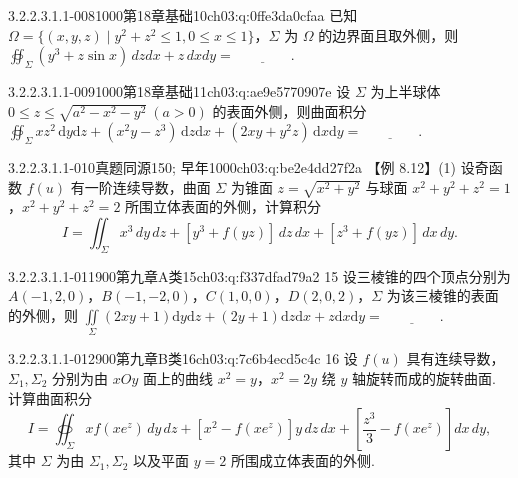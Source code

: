\begin{q}{3.2.2.3.1.1-008}{1000第18章基础10}{ch03:q:0ffe3da0cfaa}
已知 $\Omega = \{(x,y,z) \mid y^2+z^2 \le 1, 0 \le x \le 1\}$，$\Sigma$ 为 $\Omega$ 的边界面且取外侧，则
$\displaystyle \oiint_{\Sigma} (y^3+z\sin x)\,dzdx + z\,dxdy = \underline{\hspace{4em}}.$
\end{q}

\begin{q}{3.2.2.3.1.1-009}{1000第18章基础11}{ch03:q:ae9e5770907e}
设 $\Sigma$ 为上半球体 $0 \le z \le \sqrt{a^2-x^2-y^2}\ (a>0)$ 的表面外侧，则曲面积分
$\displaystyle \oiint_{\Sigma} x z^2\,\mathrm{d}y\mathrm{d}z+(x^2 y-z^3)\,\mathrm{d}z\mathrm{d}x+(2xy+y^2 z)\,\mathrm{d}x\mathrm{d}y=\underline{\hspace{4em}}.$
\end{q}

\begin{q}{3.2.2.3.1.1-010}{真题同源150; 早年1000}{ch03:q:be2e4dd27f2a}
【例 8.12】(1) 设奇函数 $f(u)$ 有一阶连续导数，曲面 $\Sigma$ 为锥面 $z=\sqrt{x^2+y^2}$ 与球面 $x^2+y^2+z^2=1$，$x^2+y^2+z^2=2$ 所围立体表面的外侧，计算积分
\[
I = \iint_{\Sigma} x^3\,dy\,dz + [y^3+f(yz)]\,dz\,dx + [z^3+f(yz)]\,dx\,dy.
\]
\end{q}

\begin{q}{3.2.2.3.1.1-011}{900第九章A类15}{ch03:q:f337dfad79a2}
15 设三棱锥的四个顶点分别为 $A(-1,2,0)$，$B(-1,-2,0)$，$C(1,0,0)$，$D(2,0,2)$，$\Sigma$ 为该三棱锥的表面的外侧，则 $\displaystyle \iint\limits_{\Sigma}(2xy+1)\mathrm{d}y\mathrm{d}z+(2y+1)\mathrm{d}z\mathrm{d}x+z\mathrm{d}x\mathrm{d}y=\underline{\hspace{4em}}.$
\end{q}

\begin{q}{3.2.2.3.1.1-012}{900第九章B类16}{ch03:q:7c6b4ecd5c4c}
16 设 $f(u)$ 具有连续导数，$\Sigma_1,\Sigma_2$ 分别为由 $xOy$ 面上的曲线 $x^2=y$，$x^2=2y$ 绕 $y$ 轴旋转而成的旋转曲面. 计算曲面积分
\[
I=\oiint_{\Sigma} xf(xe^{z})\,dy\,dz + [x^{2}-f(xe^{z})]y\,dz\,dx + \left[\frac{z^{3}}{3}-f(xe^{z})\right]dx\,dy,
\]
其中 $\Sigma$ 为由 $\Sigma_1,\Sigma_2$ 以及平面 $y=2$ 所围成立体表面的外侧.
\end{q}

